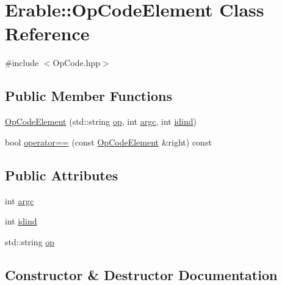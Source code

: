 \hypertarget{class_erable_1_1_op_code_element}{}\section{Erable\+::Op\+Code\+Element Class Reference}
\label{class_erable_1_1_op_code_element}


{\ttfamily \#include $<$Op\+Code.\+hpp$>$}

\subsection*{Public Member Functions}
\begin{DoxyCompactItemize}
\item 
\mbox{\hyperlink{class_erable_1_1_op_code_element_a9873b6fcadbe8ac8ed06b101a7388e87}{Op\+Code\+Element}} (std\+::string \mbox{\hyperlink{class_erable_1_1_op_code_element_aeabd3e06b3e767c681827b49e44f8df6}{op}}, int \mbox{\hyperlink{class_erable_1_1_op_code_element_a5fc2d06352c6a4e09bce876b60a28434}{argc}}, int \mbox{\hyperlink{class_erable_1_1_op_code_element_a7a7b309abb91e24736ecbf60f0cca4f0}{idind}})
\item 
bool \mbox{\hyperlink{class_erable_1_1_op_code_element_a0d23124dd1f0b042ad9a294919328e5e}{operator==}} (const \mbox{\hyperlink{class_erable_1_1_op_code_element}{Op\+Code\+Element}} \&right) const
\end{DoxyCompactItemize}
\subsection*{Public Attributes}
\begin{DoxyCompactItemize}
\item 
int \mbox{\hyperlink{class_erable_1_1_op_code_element_a5fc2d06352c6a4e09bce876b60a28434}{argc}}
\item 
int \mbox{\hyperlink{class_erable_1_1_op_code_element_a7a7b309abb91e24736ecbf60f0cca4f0}{idind}}
\item 
std\+::string \mbox{\hyperlink{class_erable_1_1_op_code_element_aeabd3e06b3e767c681827b49e44f8df6}{op}}
\end{DoxyCompactItemize}


\subsection{Constructor \& Destructor Documentation}
\mbox{\label{class_erable_1_1_op_code_element_a9873b6fcadbe8ac8ed06b101a7388e87}} 
